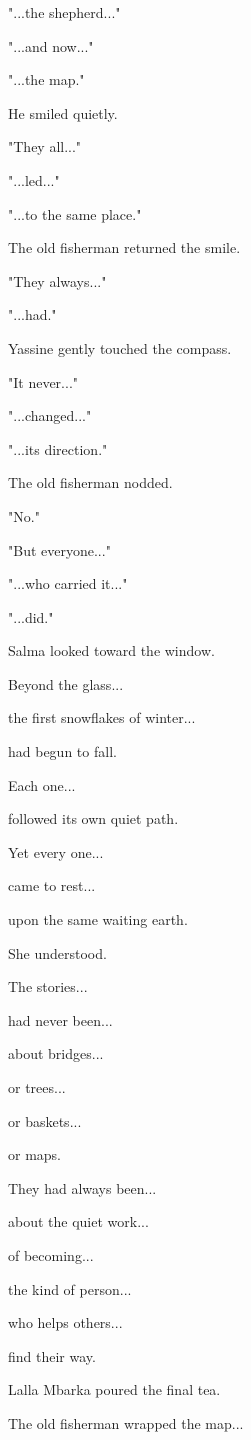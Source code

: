 \documentclass[12pt,openany]{book}
\begin{document}
"...the shepherd..."

"...and now..."

"...the map."

He smiled quietly.

"They all..."

"...led..."

"...to the same place."

The old fisherman returned the smile.

"They always..."

"...had."

Yassine gently touched the compass.

"It never..."

"...changed..."

"...its direction."

The old fisherman nodded.

"No."

"But everyone..."

"...who carried it..."

"...did."

Salma looked toward the window.

Beyond the glass...

the first snowflakes of winter...

had begun to fall.

Each one...

followed its own quiet path.

Yet every one...

came to rest...

upon the same waiting earth.

She understood.

The stories...

had never been...

about bridges...

or trees...

or baskets...

or maps.

They had always been...

about the quiet work...

of becoming...

the kind of person...

who helps others...

find their way.

Lalla Mbarka poured the final tea.

The old fisherman wrapped the map...
\end{document}
